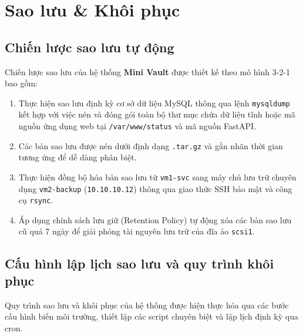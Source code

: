 \documentclass[a4paper,12pt]{article}
\begin{document}
\newpage
\section{Sao lưu \& Khôi phục}
\subsection{Chiến lược sao lưu tự động}
Chiến lược sao lưu của hệ thống \textbf{Mini Vault} được thiết kế theo mô hình 3-2-1 bao gồm:
\begin{enumerate}
    \item Thực hiện sao lưu định kỳ cơ sở dữ liệu MySQL thông qua lệnh \texttt{mysqldump} kết hợp với việc nén và đóng gói toàn bộ thư mục chứa dữ liệu tĩnh hoặc mã nguồn ứng dụng web tại \texttt{/var/www/status} và mã nguồn FastAPI.
    \item Các bản sao lưu được nén dưới định dạng \texttt{.tar.gz} và gắn nhãn thời gian tương ứng để dễ dàng phân biệt.
    \item Thực hiện đồng bộ hóa bản sao lưu từ \texttt{vm1-svc} sang máy chủ lưu trữ chuyên dụng \texttt{vm2-backup} (\texttt{10.10.10.12}) thông qua giao thức SSH bảo mật và công cụ \texttt{rsync}.
    \item Áp dụng chính sách lưu giữ (Retention Policy) tự động xóa các bản sao lưu cũ quá 7 ngày để giải phóng tài nguyên lưu trữ của đĩa ảo \texttt{scsi1}.
\end{enumerate}

\subsection{Cấu hình lập lịch sao lưu và quy trình khôi phục}
Quy trình sao lưu và khôi phục của hệ thống được hiện thực hóa qua các bước cấu hình biến môi trường, thiết lập các script chuyên biệt và lập lịch định kỳ qua cron.
\end{document}

